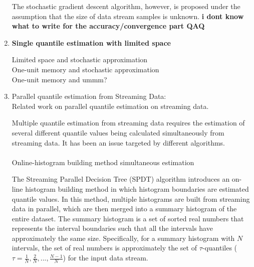 \documentclass[12pt]{article}
\begin{document}
\begin{enumerate}
    The stochastic gradient descent algorithm, however, is proposed under the assumption that the size of data stream samples is unknown. \textbf{i dont know what to write for the accuracy/convergence part QAQ}

    \item \textbf{
        Single quantile estimation with limited space\\
    }
    
    Limited space and stochastic approximation\cite{tierneySpaceEfficientRecursiveProcedure1983}\\




    One-unit memory and stochastic approximation \cite{yazidiQuantileEstimationDynamic2016}\\
    One-unit memory and ummm? \cite{maFrugalStreamingEstimating2014}\\

    \pagebreak    
    \item Parallel quantile estimation from Streaming Data: \\
        Related work on parallel quantile estimation on streaming data.



        Multiple quantile estimation from streaming data requires the estimation of several different quantile values being calculated simultaneously from streaming data. It has been an issue targeted by different algorithms.\\\\

        Online-histogram building method simultaneous estimation\cite{ben-haimStreamingParallelDecision} 

        The Streaming Parallel Decision Tree (SPDT) algorithm \cite{ben-haimStreamingParallelDecision} introduces an on-line histogram building method %
        in which histogram boundaries are estimated quantile values.
        In this method, multiple histograms are built from streaming data in parallel, which are then merged into a summary histogram of the entire dataset. The summary histogram is a set of sorted real numbers that represents the interval boundaries such that all the intervals have approximately the same size. Specifically, for a summary histogram with $N$ intervals, the set of real numbers is approximately the set of $\tau$-quantiles ($\tau = \frac{1}{N}, \frac{2}{N}, ..., \frac{N-1}{N}$) for the input data stream.


\end{enumerate}
\end{document}
